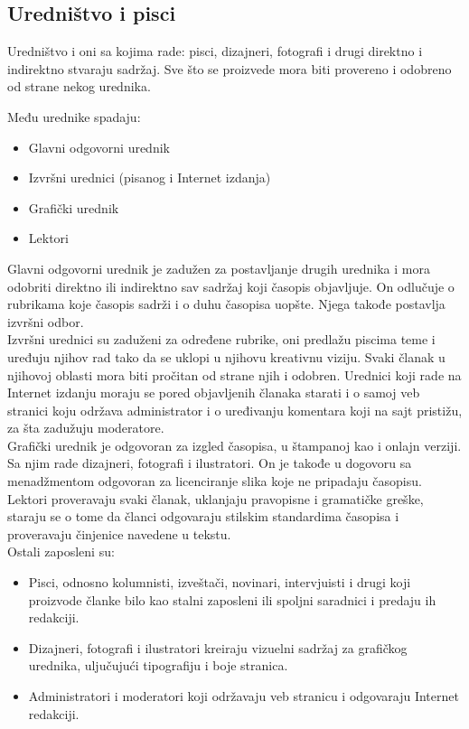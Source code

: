 \subsection{Uredništvo i pisci}

Uredništvo i oni sa kojima rade: pisci, dizajneri, fotografi i drugi direktno i indirektno stvaraju sadržaj. Sve što se proizvede mora biti provereno i odobreno od strane nekog urednika. 

Među urednike spadaju:
\begin{itemize}
\item Glavni odgovorni urednik
\item Izvršni urednici (pisanog i Internet izdanja)
\item Grafički urednik
\item Lektori
\end{itemize}

Glavni odgovorni urednik je zadužen za postavljanje drugih urednika i mora odobriti direktno ili indirektno sav sadržaj koji časopis objavljuje. On odlučuje o rubrikama koje časopis sadrži i o duhu časopisa uopšte. Njega takođe postavlja izvršni odbor. \\

Izvršni urednici su zaduženi za određene rubrike, oni predlažu piscima teme i uređuju njihov  rad tako da se uklopi u njihovu kreativnu viziju. Svaki članak u  njihovoj oblasti mora biti pročitan od strane njih i odobren. Urednici koji rade na Internet izdanju moraju se pored objavljenih članaka starati i o samoj veb stranici koju održava administrator i o uređivanju komentara koji na sajt pristižu, za šta zadužuju moderatore. \\

Grafički urednik je odgovoran za izgled časopisa, u štampanoj kao i onlajn verziji. Sa njim rade dizajneri, fotografi i ilustratori. On je takođe u dogovoru sa menadžmentom odgovoran za licenciranje slika koje ne pripadaju časopisu. \\

Lektori proveravaju svaki članak, uklanjaju pravopisne i gramatičke greške, staraju se o tome da članci odgovaraju stilskim standardima časopisa i proveravaju činjenice navedene u tekstu. \\

Ostali zaposleni su:
\begin{itemize}
\item  Pisci, odnosno kolumnisti, izveštači, novinari, intervjuisti i drugi koji proizvode članke bilo kao stalni zaposleni ili spoljni saradnici i predaju ih redakciji.
\item  Dizajneri, fotografi i ilustratori kreiraju vizuelni sadržaj za grafičkog urednika, uljučujući tipografiju i boje stranica.
\item  Administratori i moderatori koji održavaju veb stranicu i odgovaraju Internet redakciji.
\end{itemize}

